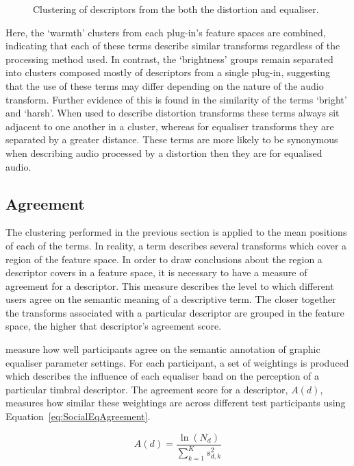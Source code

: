 \begin{figure}[h!]
{					\label{fig:CombinedDifferenceClusters}
				}
				\caption{Clustering of descriptors from the both the distortion and equaliser.}
				\label{fig:CombinedClusters}
			\end{figure}

			Here, the `warmth' clusters from each plug-in's feature spaces are combined, indicating that each
			of these terms describe similar transforms regardless of the processing method used. In contrast,
			the `brightness' groups remain separated into clusters composed mostly of descriptors from a
			single plug-in, suggesting that the use of these terms may differ depending on the nature of the
			audio transform.  Further evidence of this is found in the similarity of the terms `bright' and
			`harsh'.  When used to describe distortion transforms these terms always sit adjacent to one
			another in a cluster, whereas for equaliser transforms they are separated by a greater distance.
			These terms are more likely to be synonymous when describing audio processed by a distortion then
			they are for equalised audio. 

	\subsection{Agreement}
	\label{sec:TimbreEvaluation-Analysis-Agreement}
		The clustering performed in the previous section is applied to the mean positions of each of the terms. In
		reality, a term describes several transforms which cover a region of the feature space. In order to draw
		conclusions about the region a descriptor covers in a feature space, it is necessary to have a measure of
		agreement for a descriptor. This measure describes the level to which different users agree on the semantic
		meaning of a descriptive term. The closer together the transforms associated with a particular descriptor
		are grouped in the feature space, the higher that descriptor's agreement score.

		\citet{cartwright2013socialeq} measure how well participants agree on the semantic annotation of graphic
		equaliser parameter settings. For each participant, a set of weightings is produced which describes the
		influence of each equaliser band on the perception of a particular timbral descriptor. The agreement score
		for a descriptor, $A(d)$, measures how similar these weightings are across different test participants
		using Equation~\ref{eq:SocialEqAgreement}.

		\begin{equation}
			A(d) = \frac{\ln(N_{d})}{\sum_{k = 1}^{K} s_{d,k}^{2}}
			\label{eq:SocialEqAgreement}
		\end{equation}

